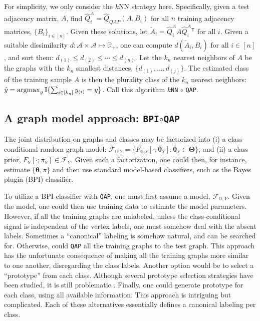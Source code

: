 \documentclass{article} %
\providecommand{\ve}[1]{\boldsymbol{#1}}
\newcommand{\argmax}{\operatornamewithlimits{argmax}}
\newcommand{\T}{^{\ensuremath{\mathsf{T}}}}           %
\newcommand{\II}{\mathbb{I}}           %
\newcommand{\bth}{\ve{\theta}}
\newcommand{\bTh}{\ve{\Theta}}
\providecommand{\mc}[1]{\mathcal{#1}}
\providecommand{\mh}[1]{\hat{#1}}
\providecommand{\mt}[1]{\widetilde{#1}}
\newcommand{\Real}{\mathbb{R}}
\newcommand{\GG}{\mathbb{G}}
\newcommand{\qap}{\texttt{QAP} }
\begin{document}
For simplicity, we only consider the $k$NN strategy here.  Specifically, given a test adjacency matrix, $A$, find $\mh{Q}_i^A=\mh{Q}_{QAP}(A,B_i)$ for all $n$ training adjacency matrices, $\{B_i\}_{i \in [n]}$.  Given these solutions, let $\mt{A}_i=\mh{Q}_i^A A {\mh{Q}_i^A}{}\T$ for all $i$. Given a suitable dissimilarity $d: \mc{A} \times \mc{A} \mapsto \Real_+$, one can compute $d(\mt{A}_i,B_i)$ for all $i \in [n]$, and sort them: $d_{(1)} \leq d_{(2)} \leq \cdots \leq d_{(n)}$.  Let the $k_n$ nearest neighbors of $A$ be the graphs with the $k_n$ smallest distances, $\{d_{(1)},\ldots, d_{(j)}\}$.  The estimated class of the training sample $A$ is then the plurality class of the $k_n$ nearest neighbors: $\mh{y}=\argmax_{y} \II\{\sum_{i \in [k_n]} y_{(i)} = y \}$. Call this algorithm \texttt{$k$NN} $\circ$ \texttt{QAP}.



\subsection{A graph model approach: \texttt{BPI}$\circ$\qap} %
\label{ssub:bayes_plugin_circ_qap}


The joint distribution on graphs and classes may be factorized into (i) a class-conditional random graph model: $\mc{F}_{\GG  | Y} = \{F_{\GG|Y}[\cdot; \bth_Y] : \bth_Y \in \bTh\}$, and (ii) a class prior, $F_Y[\cdot; \pi_Y] \in \mc{F}_Y$.  Given such a factorization, one could then, for instance, estimate $\{\bth,\pi\}$ and then use standard model-based classifiers, such as the Bayes plugin (BPI) classifier. 

To utilize a BPI classifier with \texttt{QAP}, one must first assume a model, $\mc{F}_{\GG,Y}$.  Given the model, one could then use training data to estimate the model parameters.  However, if all the training graphs are unlabeled, unless the class-conditional signal is independent of the vertex labels, one must somehow deal with the absent labels.  Sometimes a ``canonical'' labeling is somehow natural, and can be searched for.  Otherwise, could \qap all the training graphs to the test graph.  This approach has the unfortunate consequence of making all the training graphs more similar to one another, disregarding the class labels.  Another option would be to select a ``prototype'' from each class. Although several prototype selection strategies have been studied, it is still problematic \cite{Bunke2011}.  Finally, one could generate prototype for each class, using all available information.  This approach is intriguing but complicated.  Each of these alternatives essentially defines a canonical labeling per class.
\end{document}
